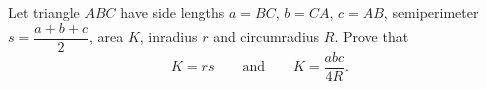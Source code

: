 Let triangle $ABC$ have side lengths $a=BC$, $b=CA$, $c=AB$, semiperimeter $s=\dfrac{a+b+c}{2}$, area $K$, inradius $r$ and circumradius $R$. Prove that
\[
K=rs\qquad\text{and}\qquad K=\dfrac{abc}{4R}.
\]
